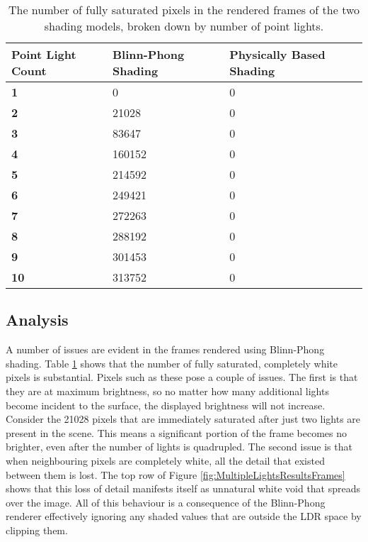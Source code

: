 \begin{table}
	\noindent\begin{tabular}{|l|l|l|}
		\hline
		\textbf{Point Light Count} & \textbf{Blinn-Phong Shading} & \textbf{Physically Based Shading} \\
		\hline\hline
		\textbf{1} & 0 & 0 \\
		\textbf{2} & 21028 & 0 \\
		\textbf{3} & 83647 & 0 \\
		\textbf{4} & 160152 & 0 \\
		\textbf{5} & 214592 & 0 \\
		\textbf{6} & 249421 & 0 \\
		\textbf{7} & 272263 & 0 \\
		\textbf{8} & 288192 & 0 \\
		\textbf{9} & 301453 & 0 \\
		\textbf{10} & 313752 & 0 \\
		\hline
	\end{tabular}
	\caption{The number of fully saturated pixels in the rendered frames of the two shading models, broken down by number of point lights.}
	\label{tb:MultipleLightsResultsSaturatedPixelValues}
\end{table}

\subsection{Analysis}

A number of issues are evident in the frames rendered using Blinn-Phong shading. Table \ref{tb:MultipleLightsResultsSaturatedPixelValues} shows that the number of fully saturated, completely white pixels is substantial. Pixels such as these pose a couple of issues. The first is that they are at maximum brightness, so no matter how many additional lights become incident to the surface, the displayed brightness will not increase. Consider the 21028 pixels that are immediately saturated after just two lights are present in the scene. This means a significant portion of the frame becomes no brighter, even after the number of lights is quadrupled. The second issue is that when neighbouring pixels are completely white, all the detail that existed between them is lost. The top row of Figure \ref{fig:MultipleLightsResultsFrames} shows that this loss of detail manifests itself as unnatural white void that spreads over the image. All of this behaviour is a consequence of the Blinn-Phong renderer effectively ignoring any shaded values that are outside the LDR space by clipping them.

